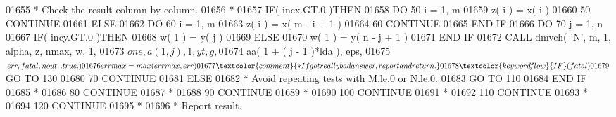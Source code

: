 \begin{DoxyCode}
01655 \textcolor{comment}{*                       Check the result column by column.}
01656 \textcolor{comment}{*}
01657                         \textcolor{keywordflow}{IF}( incx.GT.0 )\textcolor{keywordflow}{THEN}
01658                            \textcolor{keywordflow}{DO} 50 i = 1, m
01659                               z( i ) = x( i )
01660    50                      \textcolor{keywordflow}{CONTINUE}
01661                         \textcolor{keywordflow}{ELSE}
01662                            \textcolor{keywordflow}{DO} 60 i = 1, m
01663                               z( i ) = x( m - i + 1 )
01664    60                      \textcolor{keywordflow}{CONTINUE}
01665 \textcolor{keywordflow}{                        END IF}
01666                         \textcolor{keywordflow}{DO} 70 j = 1, n
01667                            \textcolor{keywordflow}{IF}( incy.GT.0 )\textcolor{keywordflow}{THEN}
01668                               w( 1 ) = y( j )
01669                            \textcolor{keywordflow}{ELSE}
01670                               w( 1 ) = y( n - j + 1 )
01671 \textcolor{keywordflow}{                           END IF}
01672                            \textcolor{keyword}{CALL }dmvch( \textcolor{stringliteral}{'N'}, m, 1, alpha, z, nmax, w, 1,
01673      $                                 one, a( 1, j ), 1, yt, g,
01674      $                                 aa( 1 + ( j - 1 )*lda ), eps,
01675      $                                 err, fatal, nout, .true. )
01676                            errmax = max( errmax, err )
01677 \textcolor{comment}{*                          If got really bad answer, report and return.}
01678                            \textcolor{keywordflow}{IF}( fatal )
01679      $                        \textcolor{keywordflow}{GO TO} 130
01680    70                   \textcolor{keywordflow}{CONTINUE}
01681                      \textcolor{keywordflow}{ELSE}
01682 \textcolor{comment}{*                       Avoid repeating tests with M.le.0 or N.le.0.}
01683                         \textcolor{keywordflow}{GO TO} 110
01684 \textcolor{keywordflow}{                     END IF}
01685 \textcolor{comment}{*}
01686    80             \textcolor{keywordflow}{CONTINUE}
01687 \textcolor{comment}{*}
01688    90          \textcolor{keywordflow}{CONTINUE}
01689 \textcolor{comment}{*}
01690   100       \textcolor{keywordflow}{CONTINUE}
01691 \textcolor{comment}{*}
01692   110    \textcolor{keywordflow}{CONTINUE}
01693 \textcolor{comment}{*}
01694   120 \textcolor{keywordflow}{CONTINUE}
01695 \textcolor{comment}{*}
01696 \textcolor{comment}{*     Report result.}

\end{DoxyCode}
